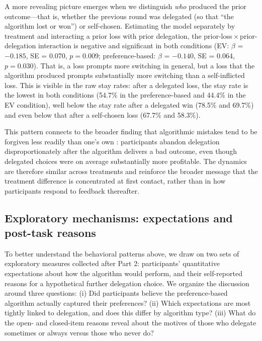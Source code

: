\documentclass[a4paper, 12pt, fleqn]{article}
\theoremstyle{definition}
\begin{document}
A more revealing picture emerges when we distinguish \emph{who} produced the prior outcome---that is, whether the previous round was delegated (so that ``the algorithm lost or won'') or self-chosen. Estimating the model separately by treatment and interacting a prior loss with prior delegation, the prior-loss\,$\times$\,prior-delegation interaction is negative and significant in both conditions (EV: $\beta$ = $-0.185$, SE = 0.070, $p = 0.009$; preference-based: $\beta$ = $-0.140$, SE = 0.064, $p = 0.030$). That is, a loss prompts more switching in general, but a loss that the algorithm produced prompts substantially more switching than a self-inflicted loss. This is visible in the raw stay rates: after a delegated loss, the stay rate is the lowest in both conditions (54.7\% in the preference-based and 44.4\% in the EV condition), well below the stay rate after a delegated win (78.5\% and 69.7\%) and even below that after a self-chosen loss (67.7\% and 58.3\%). 

This pattern connects to the broader finding that algorithmic mistakes tend to be forgiven less readily than one's own \citep{Dietvorst2018,Renier2021}: participants abandon delegation disproportionately after the algorithm delivers a bad outcome, even though delegated choices were on average substantially more profitable. The dynamics are therefore similar across treatments and reinforce the broader message that the treatment difference is concentrated at first contact, rather than in how participants respond to feedback thereafter.

\subsection{Exploratory mechanisms: expectations and post-task reasons}
\label{sec:exploratory_mechanisms}
To better understand the behavioral patterns above, we draw on two sets of exploratory measures collected after Part 2: participants' quantitative expectations about how the algorithm would perform, and their self-reported reasons for a hypothetical further delegation choice. We organize the discussion around three questions: (i) Did participants believe the preference-based algorithm actually captured their preferences? (ii) Which expectations are most tightly linked to delegation, and does this differ by algorithm type? (iii) What do the open- and closed-item reasons reveal about the motives of those who delegate sometimes or always versus those who never do?
\end{document}
